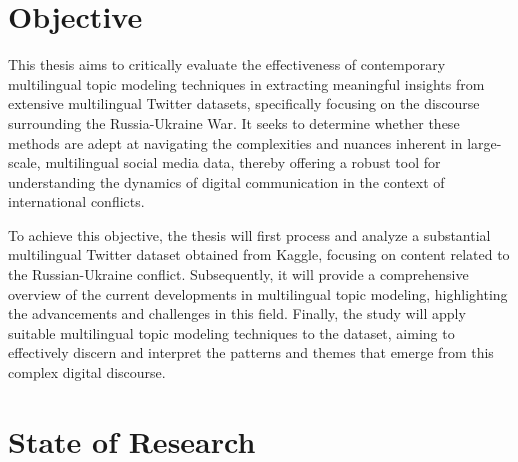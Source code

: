 \documentclass[
    11pt,
    a4paper,
    egregdoesnotlikesansseriftitles,
    toc=chapterentrywithdots,
    oneside,openright,
    titlepage,
    parskip=half,
    headings=normal,  %
    listof=totoc,
    bibliography=totoc,
    index=totoc,
    captions=tableheading,  %
    chapterprefix,
    listof=flat,
    final
]{scrbook}
\begin{document}
{\let\clearpage\relax \chapter{Objective}}
This thesis aims to critically evaluate the effectiveness of contemporary multilingual topic modeling techniques in extracting meaningful insights from extensive multilingual Twitter datasets, specifically focusing on the discourse surrounding the Russia-Ukraine War. It seeks to determine whether these methods are adept at navigating the complexities and nuances inherent in large-scale, multilingual social media data, thereby offering a robust tool for understanding the dynamics of digital communication in the context of international conflicts.

To achieve this objective, the thesis will first process and analyze a substantial multilingual Twitter dataset obtained from Kaggle, focusing on content related to the Russian-Ukraine conflict. Subsequently, it will provide a comprehensive overview of the current developments in multilingual topic modeling, highlighting the advancements and challenges in this field. Finally, the study will apply suitable multilingual topic modeling techniques to the dataset, aiming to effectively discern and interpret the patterns and themes that emerge from this complex digital discourse.

{\let\clearpage\relax \chapter{State of Research}}
\end{document}
